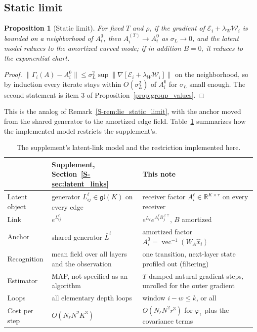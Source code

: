 \documentclass[11pt]{article}
\newtheorem{proposition}[theorem]{Proposition}
\theoremstyle{definition}
\theoremstyle{remark}
\providecommand{\gl}{\mathfrak{gl}}
\newcommand{\R}{\mathbb R}
\newcommand{\xh}{\hat x}
\newcommand{\Sref}[1]{\ref{S-#1}}
\begin{document}
\subsection{Static limit}

\begin{proposition}[Static limit]
\label{prop:static}
For fixed $T$ and $\rho$, if the gradient of $\mathcal E_i+\lambda_W\mathcal W_i$ is bounded on a neighborhood of $A_i^0$, then $A_i^{(T)}\to A_i^0$ as $\sigma_L\to0$, and the latent model reduces to the amortized curved mode; if in addition $B=0$, it reduces to the exponential chart.
\end{proposition}
\begin{proof}
$\|\Gamma_i(A)-A_i^0\|\le\sigma_L^2\sup\|\nabla[\mathcal E_i+\lambda_W\mathcal W_i]\|$ on the neighborhood, so by induction every iterate stays within $O(\sigma_L^2)$ of $A_i^0$ for $\sigma_L$ small enough. The second statement is item 3 of Proposition~\ref{prop:group_values}.
\end{proof}

This is the analog of Remark~\Sref{rem:lie_static_limit}, with the anchor moved from the shared generator to the amortized edge field. Table~\ref{tab:compare} summarizes how the implemented model restricts the supplement's.

\begin{table}[tbp]
\centering
\small
\renewcommand{\arraystretch}{1.15}
\begin{tabularx}{\textwidth}{@{}>{\raggedright\arraybackslash}p{2.6cm}>{\raggedright\arraybackslash}X>{\raggedright\arraybackslash}X@{}}
\toprule
 & Supplement, Section~\Sref{sec:latent_links} & This note \\
\midrule
Latent object & generator $L^\ell_{ij}\in\gl(K)$ on every edge & receiver factor $A^\ell_i\in\R^{K\times r}$ on every receiver \\
Link & $e^{L^\ell_{ij}}$ & $e^{L_\ell}e^{A_i^\ell B_j^{\ell\top}}$, $B$ amortized \\
Anchor & shared generator $\bar L^\ell$ & amortized factor $A_i^0=\operatorname{vec}^{-1}(W_A\xh_i)$ \\
Recognition & mean field over all layers and the observation & one transition, next-layer state profiled out (filtering) \\
Estimator & MAP, not specified as an algorithm & $T$ damped natural-gradient steps, unrolled for the outer gradient \\
Loops & all elementary depth loops & window $i-w\le k$, or all \\
Cost per step & $O(N_\ell N^2K^3)$ & $O(N_\ell N^2r^3)$ for $\varphi_1$ plus the covariance terms \\
\bottomrule
\end{tabularx}
\caption{The supplement's latent-link model and the restriction implemented here.}
\label{tab:compare}
\end{table}
\end{document}
